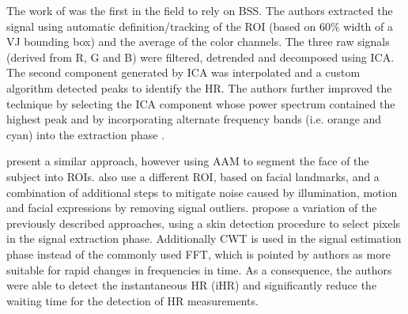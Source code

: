 
The work of \textcite{poh2010non} was the first in the field to rely on BSS. The authors extracted the signal using automatic definition/tracking of the ROI (based on 60\% width of a VJ bounding box) and the average of the color channels. The three raw signals (derived from R, G and B) were filtered, detrended and decomposed using ICA. The second component generated by ICA was interpolated and a custom algorithm detected peaks to identify the HR. The authors further improved the technique by selecting the ICA component whose power spectrum contained the highest peak \parencite{poh2011advancements} and by incorporating alternate frequency bands (i.e. orange and cyan) into the extraction phase \parencite{mcduff2014improvements}.

\textcite{Datcu_2013} present a similar approach, however using AAM to segment the face of the subject into ROIs. \textcite{li2014remote} also use a different ROI, based on facial landmarks, and a combination of additional steps to mitigate noise caused by illumination, motion and facial expressions by removing signal outliers. \textcite{bousefsaf2013continuous} propose a variation of the previously described approaches, using a skin detection procedure to select pixels in the signal extraction phase. Additionally CWT is used in the signal estimation phase instead of the commonly used FFT, which is pointed by authors as more suitable for rapid changes in frequencies in time. As a consequence, the authors were able to detect the instantaneous HR (iHR) and significantly reduce the waiting time for the detection of HR measurements.


